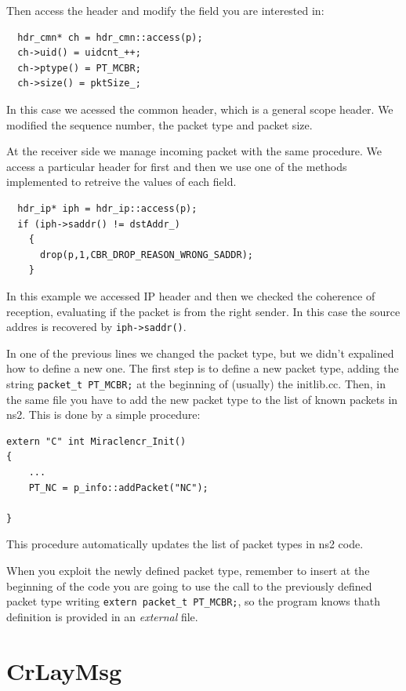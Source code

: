 \documentclass[a4paper,10pt]{article}
\begin{document}
Then access the header and modify the field you are interested in:
\begin{verbatim}
  hdr_cmn* ch = hdr_cmn::access(p);
  ch->uid() = uidcnt_++;
  ch->ptype() = PT_MCBR;
  ch->size() = pktSize_;
\end{verbatim}
In this case we acessed the common header, which is a general scope header. We modified the sequence number, the packet type and packet size.

At the receiver side we manage incoming packet with the same procedure. We access a particular header for first and then we use one of the methods implemented to retreive the values of each field.
\begin{verbatim}
  hdr_ip* iph = hdr_ip::access(p);
  if (iph->saddr() != dstAddr_)
    {
      drop(p,1,CBR_DROP_REASON_WRONG_SADDR);
    }
\end{verbatim}
In this example we accessed IP header and then we checked the coherence of reception, evaluating if the packet is from the right sender. In this case the source addres is recovered by \verb=iph->saddr()=.

In one of the previous lines we changed the packet type, but we didn't expalined how to define a new one.
The first step is to define a new packet type, adding the string \verb=packet_t PT_MCBR;= at the beginning of (usually) the initlib.cc.
Then, in the same file you have to add the new packet type to the list of known packets in ns2. This is done by a simple procedure:
\begin{verbatim}
extern "C" int Miraclencr_Init()
{
	...
	PT_NC = p_info::addPacket("NC");

}
\end{verbatim}
This procedure automatically updates the list of packet types in ns2 code.

When you exploit the newly defined packet type, remember to insert at the beginning of the code you are going to use the call to the previously defined packet type writing \verb=extern packet_t PT_MCBR;=, so the program knows thath definition is provided in an \emph{external} file.

\section{CrLayMsg}
\end{document}
